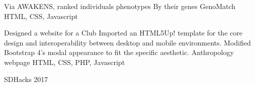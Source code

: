 \documentclass[]{awesome-cv}
\begin{document}
\vspace{-7mm}
\begin{cventries}
	\cventry
	{Via AWAKENS, ranked individuals phenotypes By their genes}
	{GenoMatch}
	{HTML, CSS, Javascript}
	{}
	{}
	
	\vspace{-5mm}
	\cventry
	{Designed a website for a Club Imported an HTML5Up! template for the core design and interoperability between desktop and mobile environments. Modified Bootstrap 4’s modal appearance to fit the specific aesthetic.}
	{Anthropology webpage}
	{HTML, CSS, PHP, Javascript}
	{}
	{}
	
	\vspace{-5mm}
\end{cventries}
\begin{cvhonors}
	\cvhonor
	{SDHacks 2017}
	{}
	{}
	{}
\end{cvhonors}
\ 
\end{document}
